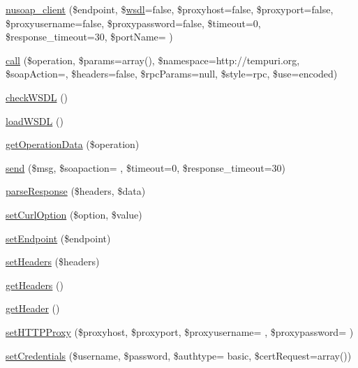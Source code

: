 \begin{DoxyCompactItemize}
\hyperlink{classnusoap__client_ae2c5b2115e9315e43f0368d1b13f44c3}{nusoap\+\_\+client} (\$endpoint, \$\hyperlink{classwsdl}{wsdl}=false, \$proxyhost=false, \$proxyport=false, \$proxyusername=false, \$proxypassword=false, \$timeout=0, \$response\+\_\+timeout=30, \$port\+Name= \textquotesingle{}\textquotesingle{})
\item 
\hyperlink{classnusoap__client_a806d1d83f45454caf9c6c361c0a4b0ad}{call} (\$operation, \$params=array(), \$namespace=\textquotesingle{}http\+://tempuri.\+org\textquotesingle{}, \$soap\+Action=\textquotesingle{}\textquotesingle{}, \$headers=false, \$rpc\+Params=null, \$style=\textquotesingle{}rpc\textquotesingle{}, \$use=\textquotesingle{}encoded\textquotesingle{})
\item 
\hyperlink{classnusoap__client_a87e102c284606feef544e3633de91d42}{check\+W\+S\+D\+L} ()
\item 
\hyperlink{classnusoap__client_a1286e71c7b97874e11b2b0caf7694e8a}{load\+W\+S\+D\+L} ()
\item 
\hyperlink{classnusoap__client_ad66fb2de1dae9b9597bed83de4f343a7}{get\+Operation\+Data} (\$operation)
\item 
\hyperlink{classnusoap__client_aece60a5a6bd359481071516aa7024b56}{send} (\$msg, \$soapaction= \textquotesingle{}\textquotesingle{}, \$timeout=0, \$response\+\_\+timeout=30)
\item 
\hyperlink{classnusoap__client_aca1ed2155629bfc242ddea3636ac24c1}{parse\+Response} (\$headers, \$data)
\item 
\hyperlink{classnusoap__client_a314f6d38ace6f3d92d0d1d7e8cfc0aaf}{set\+Curl\+Option} (\$option, \$value)
\item 
\hyperlink{classnusoap__client_abab265adeddb116a65a24dc0fa1eafb2}{set\+Endpoint} (\$endpoint)
\item 
\hyperlink{classnusoap__client_ac1f59fefc1b33175a734321e13b42253}{set\+Headers} (\$headers)
\item 
\hyperlink{classnusoap__client_a157e0005d82edaa21cbea07fdc5c62da}{get\+Headers} ()
\item 
\hyperlink{classnusoap__client_a614834f1605e407376028e8c82298c82}{get\+Header} ()
\item 
\hyperlink{classnusoap__client_a52152e7ae9c46863424bbafacf6a7f71}{set\+H\+T\+T\+P\+Proxy} (\$proxyhost, \$proxyport, \$proxyusername= \textquotesingle{}\textquotesingle{}, \$proxypassword= \textquotesingle{}\textquotesingle{})
\item 
\hyperlink{classnusoap__client_ada213133d177c1c9c07435d65e89e735}{set\+Credentials} (\$username, \$password, \$authtype= \textquotesingle{}basic\textquotesingle{}, \$cert\+Request=array())

\end{DoxyCompactItemize}
